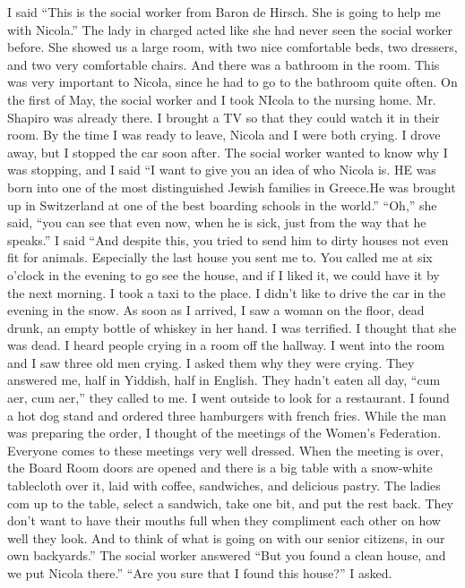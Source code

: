 I said “This is the social worker from Baron de Hirsch. She is going to help me with Nicola.” The lady in charged acted like she had never seen the social worker before. She showed us a large room, with two nice comfortable beds, two dressers, and two very comfortable chairs. And there was a bathroom in the room. This was very important to Nicola, since he had to go to the bathroom quite often.
On the first of May, the social worker and I took NIcola to the nursing home. Mr. Shapiro was already there. I brought a TV so that they could watch it in their room. By the time I was ready to leave, Nicola and I were both crying.
I drove away, but I stopped the car soon after. The social worker wanted to know why I was stopping, and I said “I want to give you an idea of who Nicola is. HE was born into one of the most distinguished Jewish families in Greece.He was brought up in Switzerland at one of the best boarding schools in the world.”
“Oh,” she said, “you can see that even now, when he is sick, just from the way that he speaks.”
I said “And despite this, you tried to send him to dirty houses not even fit for animals. Especially the last house you sent me to. You called me at six o’clock in the evening to go see the house, and if I liked it, we could have it by the next morning. I took a taxi to the place. I didn’t like to drive the car in the evening in the snow. As soon as I arrived, I saw a woman on the floor, dead drunk, an empty bottle of whiskey in her hand. I was terrified. I thought that she was dead. I heard people crying in a room off the hallway. I went into the room and I saw three old men crying. I asked them why they were crying. They answered me, half in Yiddish, half in English. They hadn’t eaten all day, “cum aer, cum aer,” they called to me. I went outside to look for a restaurant. I found a hot dog stand and ordered three hamburgers with french fries. While the man was preparing the order, I thought of the meetings of the Women’s Federation. Everyone comes to these meetings very well dressed. When the meeting is over, the Board Room doors are opened and there is a big table with a snow-white tablecloth over it, laid with coffee, sandwiches, and delicious pastry. The ladies com up to the table, select a sandwich, take one bit, and put the rest back. They don’t want to have their mouths full when they compliment each other on how well they look. And to think of what is going on with our senior citizens, in our own backyards.” 
The social worker answered “But you found a clean house, and we put Nicola there.”
“Are you sure that I found this house?” I asked.

